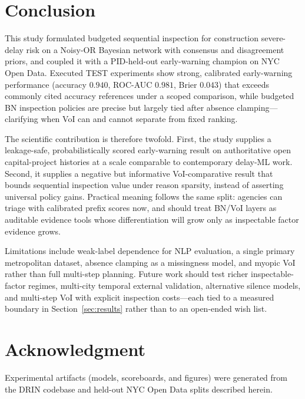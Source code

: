 \documentclass[journal]{IEEEtran}
\begin{document}
\section{Conclusion}
\label{sec:conclusion}

This study formulated budgeted sequential inspection for construction severe-delay risk on a Noisy-OR Bayesian network with consensus and disagreement priors, and coupled it with a PID-held-out early-warning champion on NYC Open Data. Executed TEST experiments show strong, calibrated early-warning performance (accuracy $0.940$, ROC-AUC $0.981$, Brier $0.043$) that exceeds commonly cited accuracy references under a scoped comparison, while budgeted BN inspection policies are precise but largely tied after absence clamping---clarifying when VoI can and cannot separate from fixed ranking.

The scientific contribution is therefore twofold. First, the study supplies a leakage-safe, probabilistically scored early-warning result on authoritative open capital-project histories at a scale comparable to contemporary delay-ML work. Second, it supplies a negative but informative VoI-comparative result that bounds sequential inspection value under reason sparsity, instead of asserting universal policy gains. Practical meaning follows the same split: agencies can triage with calibrated prefix scores now, and should treat BN/VoI layers as auditable evidence tools whose differentiation will grow only as inspectable factor evidence grows.

Limitations include weak-label dependence for NLP evaluation, a single primary metropolitan dataset, absence clamping as a missingness model, and myopic VoI rather than full multi-step planning. Future work should test richer inspectable-factor regimes, multi-city temporal external validation, alternative silence models, and multi-step VoI with explicit inspection costs---each tied to a measured boundary in Section~\ref{sec:results} rather than to an open-ended wish list.

\section*{Acknowledgment}
Experimental artifacts (models, scoreboards, and figures) were generated from the DRIN codebase and held-out NYC Open Data splits described herein.



\end{document}
